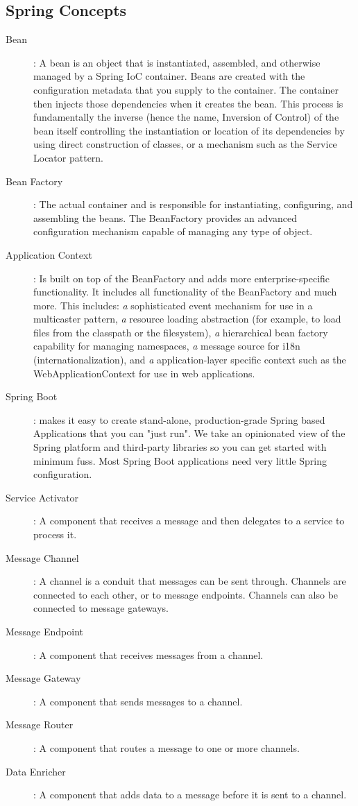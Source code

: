 \subsection{Spring Concepts}
\begin{description}
  \item [Bean]: A bean is an object that is instantiated, assembled, and otherwise managed by a Spring IoC container. Beans are created with the configuration metadata that you supply to the container. The container then injects those dependencies when it creates the bean. This process is fundamentally the inverse (hence the name, Inversion of Control) of the bean itself controlling the instantiation or location of its dependencies by using direct construction of classes, or a mechanism such as the Service Locator pattern.
  \item [Bean Factory]: The actual container and is responsible for instantiating, configuring, and assembling the beans. The BeanFactory provides an advanced configuration mechanism capable of managing any type of object.
  \item [Application Context]: Is built on top of the BeanFactory and adds more enterprise-specific functionality. It includes all functionality of the BeanFactory and much more. This includes: \textit{a} sophisticated event mechanism for use in a multicaster pattern, \textit{a} resource loading abstraction (for example, to load files from the classpath or the filesystem), \textit{a} hierarchical bean factory capability for managing namespaces, \textit{a} message source for i18n (internationalization), and \textit{a} application-layer specific context such as the WebApplicationContext for use in web applications.
  \item [Spring Boot]: makes it easy to create stand-alone, production-grade Spring based Applications that you can "just run". We take an opinionated view of the Spring platform and third-party libraries so you can get started with minimum fuss. Most Spring Boot applications need very little Spring configuration.
  \item [Service Activator]: A component that receives a message and then delegates to a service to process it.
  \item [Message Channel]: A channel is a conduit that messages can be sent through. Channels are connected to each other, or to message endpoints. Channels can also be connected to message gateways.
  \item [Message Endpoint]: A component that receives messages from a channel.
  \item [Message Gateway]: A component that sends messages to a channel.
  \item [Message Router]: A component that routes a message to one or more channels.
  \item [Data Enricher]: A component that adds data to a message before it is sent to a channel.
\end{description}


